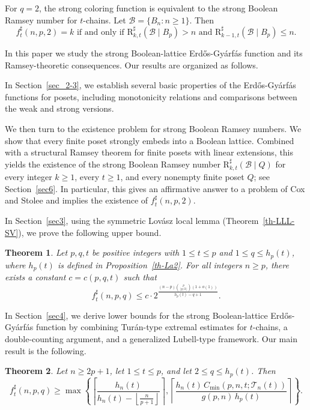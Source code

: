 \documentclass[twoside,12pt]{article}
\newcommand{\flr}[1]{\left\lfloor #1 \right\rfloor}
\newcommand{\floor}[1]{\flr{#1}}
\newcommand{\ceil}[1]{\left\lceil #1 \right\rceil}
\newtheorem{theorem}{Theorem}[section]
\newcommand{\BRs}{\mathrm{R}^{\sharp}}
\begin{document}
For $q=2$, the strong coloring function is equivalent to the strong Boolean Ramsey number for $t$-chains. Let
$\mathcal B=\{B_n:n\ge1\}$.
Then
\begin{equation}\label{eq:ft-Ramsey-equivalence}
f_t^\sharp(n,p,2)=k
\text{ if and only if }
\BRs_{k,t}(\mathcal B\mid B_p)>n
\text{ and }
\BRs_{k-1,t}(\mathcal B\mid B_p)\le n.
\end{equation}

In this paper we study the strong Boolean-lattice Erd\H{o}s-Gy\'{a}rf\'{a}s function and its Ramsey-theoretic consequences. Our results are organized as follows.

In Section~\ref{sec_2-3}, we establish several basic properties of the Erd\H{o}s-Gy\'{a}rf\'{a}s functions for posets, including monotonicity relations and comparisons between the weak and strong versions.

We then turn to the existence problem for strong Boolean Ramsey numbers. We show that every finite poset strongly embeds into a Boolean lattice. Combined with a structural Ramsey theorem for finite posets with linear extensions, this yields the existence of the strong Boolean Ramsey number
$\mathrm{R}^{\sharp}_{k,t}(\mathcal{B}\mid Q)$
for every integer $k\ge1$, every $t\ge1$, and every nonempty finite poset $Q$; see Section~\ref{sec6}. In particular, this gives an affirmative answer to a problem of Cox and Stolee and implies the existence of $f_t^{\sharp}(n,p,2)$.


In Section~\ref{sec3}, using the symmetric Lov\'asz local lemma (Theorem~\ref{th-LLL-SV}), we prove the following upper bound.

\begin{theorem}\label{th-upper-Pr}
Let \(p, q, t\) be positive integers with $1 \le t \le p$ and $1 \le q \le h_p(t)$, where \(h_p(t)\) is defined in Proposition~\ref{th-La2}. For all integers \(n \ge p\), there exists a constant \(c=c(p,q,t)\) such that
\[
f_t^{\sharp}(n,p,q)\le
c\cdot 2^{\frac{(n-p)\binom{p}{\lfloor p/2\rfloor}(1+o(1))}{h_p(t)-q+1}}.
\]
\end{theorem}


In Section~\ref{sec4}, we derive lower bounds for the strong Boolean-lattice Erd\H{o}s-Gy\'{a}rf\'{a}s function by combining Tur\'an-type extremal estimates for $t$-chains, a double-counting argument, and a generalized Lubell-type framework. Our main result is the following.

\begin{theorem}\label{th123}
Let $n\ge 2p+1$, let $1\le t\le p$, and let $2\le q\le h_p(t)$. Then
\[
f_t^\sharp(n,p,q)
\ge
\max\left\{
\ceil{\frac{h_n(t)}{h_n(t)-\floor{\frac{n}{p+1}}}},
\ceil{\frac{h_n(t)\,C_{\min}(p,n,t;\mathcal T_n(t))}{g(p,n)\,h_p(t)}}
\right\}.
\]
\end{theorem}
\end{document}
